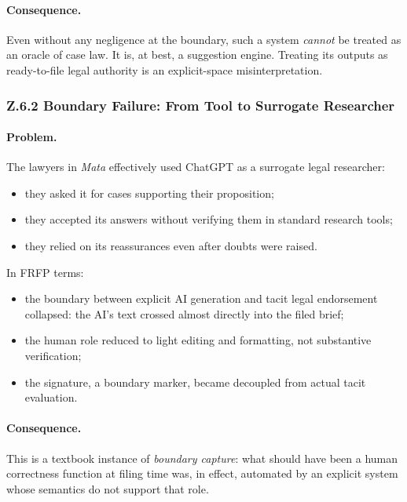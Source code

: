 \paragraph{Consequence.}
Even without any negligence at the boundary, such a system \emph{cannot} be
treated as an oracle of case law.
It is, at best, a suggestion engine.
Treating its outputs as ready-to-file legal authority is an explicit-space
misinterpretation.

\subsubsection*{Z.6.2 Boundary Failure: From Tool to Surrogate Researcher}

\paragraph{Problem.}
The lawyers in \emph{Mata} effectively used ChatGPT as a surrogate legal
researcher:

\begin{itemize}
  \item they asked it for cases supporting their proposition;
  \item they accepted its answers without verifying them in standard research
        tools;
  \item they relied on its reassurances even after doubts were raised.
\end{itemize}

In FRFP terms:

\begin{itemize}
  \item the boundary between explicit AI generation and tacit legal
        endorsement collapsed: the AI’s text crossed almost directly into
        the filed brief;
  \item the human role reduced to light editing and formatting, not
        substantive verification;
  \item the signature, a boundary marker, became decoupled from actual
        tacit evaluation.
\end{itemize}

\paragraph{Consequence.}
This is a textbook instance of \emph{boundary capture}:
what should have been a human correctness function at filing time was, in
effect, automated by an explicit system whose semantics do not support that
role.

